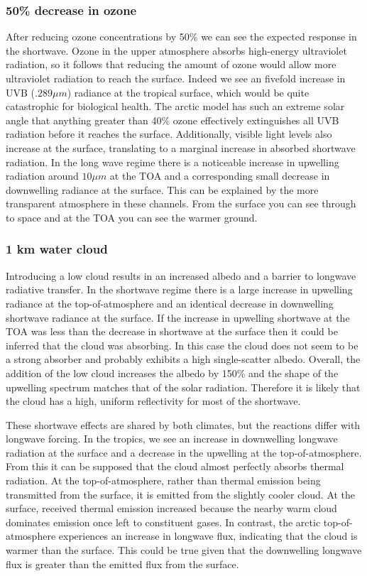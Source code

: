 \documentclass[twocol]{ametsoc}
\begin{document}
\subsubsection{50\% decrease in ozone}
After reducing ozone concentrations by 50\% we can see the expected response in the shortwave. Ozone in the upper atmosphere absorbs high-energy ultraviolet radiation, so it follows that reducing the amount of ozone would allow more ultraviolet radiation to reach the surface. Indeed we see an fivefold increase in UVB ($.289\mu m$) radiance at the tropical surface, which would be quite catastrophic for biological health. The arctic model has such an extreme solar angle that anything greater than 40\% ozone effectively extinguishes all UVB radiation before it reaches the surface. Additionally, visible light levels also increase at the surface, translating to a marginal increase in absorbed shortwave radiation. In the long wave regime there is a noticeable increase in upwelling radiation around $10\mu m$ at the TOA and a corresponding small decrease in downwelling radiance at the surface. This can be explained by the more transparent atmosphere in these channels. From the surface you can see through to space and at the TOA you can see the warmer ground.

\subsubsection{1 km water cloud}
Introducing a low cloud results in an increased albedo and a barrier to longwave radiative transfer. In the shortwave regime there is a large increase in upwelling radiance at the top-of-atmosphere and an identical decrease in downwelling shortwave radiance at the surface. If the increase in upwelling shortwave at the TOA was less than the decrease in shortwave at the surface then it could be inferred that the cloud was absorbing. In this case the cloud does not seem to be a strong absorber and probably exhibits a high single-scatter albedo. Overall, the addition of the low cloud increases the albedo by 150\% and the shape of the upwelling spectrum matches that of the solar radiation. Therefore it is likely that the cloud has a high, uniform reflectivity for most of the shortwave.

These shortwave effects are shared by both climates, but the reactions differ with longwave forcing. In the tropics, we see an increase in downwelling longwave radiation at the surface and a decrease in the upwelling at the top-of-atmosphere. From this it can be supposed that the cloud almost perfectly absorbs thermal radiation. At the top-of-atmosphere, rather than thermal emission being transmitted from the surface, it is emitted from the slightly cooler cloud. At the surface, received thermal emission increased because the nearby warm cloud dominates emission once left to constituent gases. In contrast, the arctic top-of-atmosphere experiences an increase in longwave flux, indicating that the cloud is warmer than the surface. This could be true given that the downwelling longwave flux is greater than the emitted flux from the surface.
\end{document}
